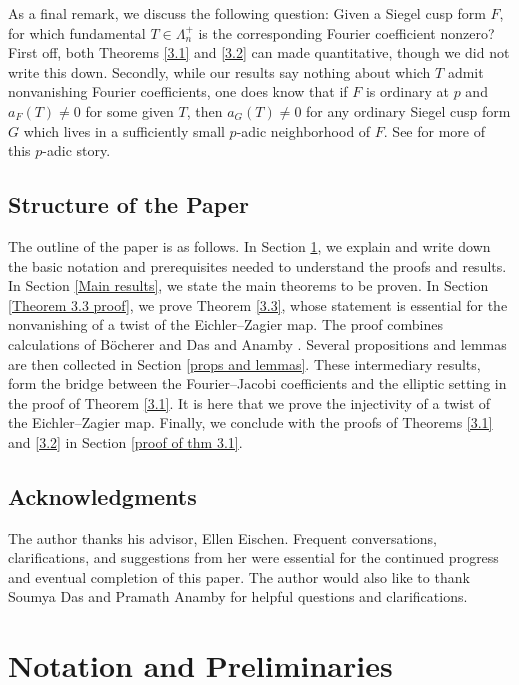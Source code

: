 \documentclass[11pt]{article}
\theoremstyle{definition}
\theoremstyle{remark}
\begin{document}
As a final remark, we discuss the following question: Given a Siegel cusp form $F$, for which fundamental $T \in \Lambda_n^+$ is the corresponding Fourier coefficient nonzero? First off, both Theorems \ref{3.1} and \ref{3.2} can made quantitative, though we did not write this down. Secondly, while our results say nothing about which $T$ admit nonvanishing Fourier coefficients, one does know that if $F$ is ordinary at $p$ and $a_F(T) \neq 0$ for some given $T$, then $a_G(T) \neq 0$ for any ordinary Siegel cusp form $G$ which lives in a sufficiently small $p$-adic neighborhood of $F$. See \cite{andreatta} for more of this $p$-adic story.

\subsection{Structure of the Paper}

The outline of the paper is as follows. In Section \ref{Notation}, we explain and write down the basic notation and prerequisites needed to understand the proofs and results. In Section \ref{Main results}, we state the main theorems to be proven. In Section \ref{Theorem 3.3 proof}, we prove Theorem \ref{3.3}, whose statement is essential for the nonvanishing of a twist of the Eichler--Zagier map. The proof combines calculations of B\"ocherer and Das \cite{BD} and Anamby \cite{anamby}. Several propositions and lemmas are then collected in Section \ref{props and lemmas}. These intermediary results, form the bridge between the Fourier--Jacobi coefficients and the elliptic setting in the proof of Theorem \ref{3.1}. It is here that we prove the injectivity of a twist of the Eichler--Zagier map. Finally, we conclude with the proofs of Theorems \ref{3.1} and \ref{3.2} in Section \ref{proof of thm 3.1}. 

\subsection{Acknowledgments}

The author thanks his advisor, Ellen Eischen. Frequent conversations, clarifications, and suggestions from her were essential for the continued progress and eventual completion of this paper. The author would also like to thank Soumya Das and Pramath Anamby for helpful questions and clarifications. 

\section{Notation and Preliminaries} \label{Notation}
\end{document}
